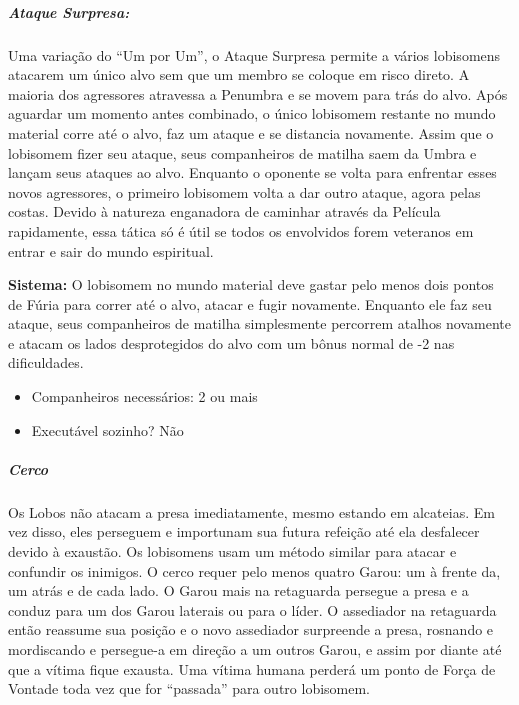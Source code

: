 \begin{multicols}{2}
\subparagraph{\bf Ataque Surpresa:}
Uma variação do “Um por Um”, o Ataque Surpresa permite a vários lobisomens atacarem um único alvo sem que um membro se coloque em risco direto. A maioria dos agressores atravessa a Penumbra e se movem para trás do alvo. Após aguardar um momento antes combinado, o único lobisomem restante no mundo material corre até o alvo, faz um ataque e se distancia novamente. Assim que o lobisomem fizer seu ataque, seus companheiros de matilha saem da Umbra e lançam seus ataques ao alvo. Enquanto o oponente se volta para enfrentar esses novos agressores, o primeiro lobisomem volta a dar outro ataque, agora pelas costas. Devido à natureza enganadora de caminhar através da Película rapidamente, essa tática só é útil se todos os envolvidos forem veteranos em entrar e sair do mundo espiritual.

{\bf Sistema:} O lobisomem no mundo material deve gastar pelo menos dois pontos de Fúria para correr até o alvo, atacar e fugir novamente. Enquanto ele faz seu ataque, seus companheiros de matilha simplesmente percorrem atalhos novamente e atacam os lados desprotegidos do alvo com um bônus normal de -2 nas dificuldades.
\begin{itemize}[noitemsep]
\item Companheiros necessários: 2 ou mais
\item Executável sozinho? Não
\end{itemize}

\subparagraph{\bf Cerco}
Os Lobos não atacam a presa imediatamente, mesmo estando em alcateias. Em vez disso, eles perseguem e importunam sua futura refeição até ela desfalecer devido à exaustão. Os lobisomens usam um método similar para atacar e confundir os inimigos.
O cerco requer pelo menos quatro Garou: um à frente da, um atrás e de cada lado. O Garou mais na retaguarda persegue a presa e a conduz para um dos Garou laterais ou para o líder. O assediador na retaguarda então reassume sua posição e o novo assediador surpreende a presa, rosnando e mordiscando e persegue-a   em direção a um outros Garou, e assim por diante até que a vítima fique exausta. Uma vítima humana perderá um ponto de Força de Vontade toda vez que for “passada” para outro lobisomem.


\end{multicols}
